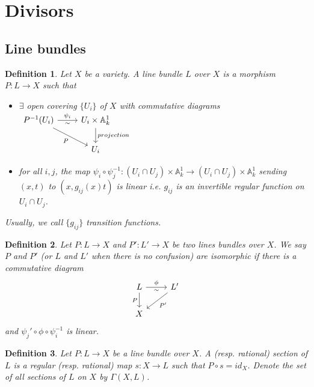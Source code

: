 \documentclass{ctexart}
\newtheorem{definition}{Definition}[section]
\begin{document}
\section{Divisors}
\label{section:Divisors}

\subsection{Line bundles}
\label{subsection:Divisors_Line_bundles}

\begin{definition}
    Let $X$ be a variety.
    A line bundle $L$ over $X$ is a morphism $P: L \rightarrow X$ such that
    \begin{itemize}
        \item $\exists$ open covering $\{U_{i}\}$ of $X$ with commutative diagrams
        $
        \begin{tikzcd}
            P^{-1}(U_{i}) \arrow[r, "\psi_{i}", "\sim" swap] \arrow[rd, "P" swap] &
            U_{i} \times \mathbb{A}_{k}^{1} \arrow[d, "projection"] \\
            & U_{i}   
        \end{tikzcd}
        $
        \item for all $i, j$, the map $\psi_{i} \circ \psi_{j}^{-1}: (U_{i} \cap U_{j}) \times \mathbb{A}_{k}^{1} \rightarrow (U_{i} \cap U_{j}) \times \mathbb{A}_{k}^{1}$ sending $(x, t)$ to $(x, g_{ij}(x)t)$ is linear i.e. $g_{ij}$ is an invertible regular function on $U_{i} \cap U_{j}$.
    \end{itemize}
    Usually, we call $\{g_{ij}\}$ transition functions.
\end{definition}
\begin{definition}
    Let $P: L \rightarrow X$ and $P': L' \rightarrow X$ be two lines bundles over $X$.
    We say $P$ and $P'$ (or $L$ and $L'$ when there is no confusion) are isomorphic if there is a commutative diagram
    \begin{equation}
        \begin{tikzcd}
            L \arrow[r, "\phi", "\sim" swap] \arrow[d, "P" swap] &
            L' \arrow[dl, "P'"] \\
            X &
        \end{tikzcd}
    \end{equation}
    and $\psi_{j}' \circ \phi \circ \psi_{i}^{-1}$ is linear.
\end{definition}
\begin{definition}
    Let $P: L \rightarrow X$ be a line bundle over $X$.
    A (resp. rational) section of $L$ is a regular (resp. rational) map $s: X \rightarrow L$ such that $P \circ s = id_{X}$.
    Denote the set of all sections of $L$ on $X$ by $\Gamma(X, L)$.
\end{definition}
\end{document}
